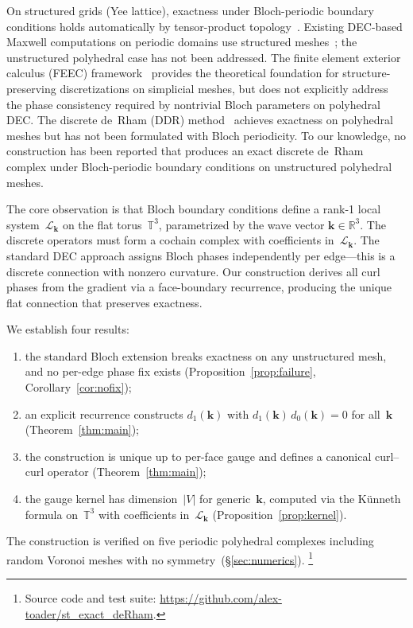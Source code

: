 \documentclass[11pt]{article}
\theoremstyle{remark}
\newcommand{\bk}{\mathbf{k}}
\newcommand{\RR}{\mathbb{R}}
\newcommand{\TT}{\mathbb{T}}
\begin{document}
On structured grids (Yee lattice), exactness under Bloch-periodic boundary
conditions holds automatically by tensor-product
topology~\cite{Monkola2023,Teixeira1999}. Existing DEC-based Maxwell
computations on periodic domains use structured
meshes~\cite{Monkola2023,Teixeira1999}; the unstructured polyhedral case
has not been addressed. The finite element exterior calculus (FEEC)
framework~\cite{Arnold2006,Arnold2010,Hiptmair2002} provides the
theoretical foundation for structure-preserving discretizations on
simplicial meshes, but does not explicitly address the phase consistency
required by nontrivial Bloch parameters on polyhedral DEC. The discrete
de~Rham (DDR) method~\cite{DiPietro2020} achieves exactness on polyhedral
meshes but has not been formulated with Bloch periodicity. To our knowledge,
no construction has been reported that produces an exact discrete de~Rham
complex under Bloch-periodic boundary conditions on unstructured polyhedral
meshes.

The core observation is that Bloch boundary conditions define a rank-1
local system~$\mathcal{L}_\bk$ on the flat torus~$\TT^3$, parametrized
by the wave vector $\bk \in \RR^3$. The discrete operators must form a
cochain complex with coefficients in~$\mathcal{L}_\bk$. The standard DEC
approach assigns Bloch phases independently per edge---this is a discrete
connection with nonzero curvature. Our construction derives all curl phases
from the gradient via a face-boundary recurrence, producing the unique flat
connection that preserves exactness.

We establish four results:
\begin{enumerate}[label=(\roman*),nosep]
\item the standard Bloch extension breaks exactness on any unstructured
mesh, and no per-edge phase fix exists (Proposition~\ref{prop:failure},
Corollary~\ref{cor:nofix});
\item an explicit recurrence constructs $d_1(\bk)$ with
$d_1(\bk)\,d_0(\bk) = 0$ for all~$\bk$ (Theorem~\ref{thm:main});
\item the construction is unique up to per-face gauge and defines a
canonical curl--curl operator (Theorem~\ref{thm:main});
\item the gauge kernel has dimension~$|V|$ for generic~$\bk$, computed
via the K\"unneth formula on~$\TT^3$ with coefficients
in~$\mathcal{L}_\bk$ (Proposition~\ref{prop:kernel}).
\end{enumerate}
The construction is verified on five periodic polyhedral complexes
including random Voronoi meshes with no symmetry~(\S\ref{sec:numerics}).%
\footnote{Source code and test suite:
\url{https://github.com/alex-toader/st_exact_deRham}.}
\end{document}
